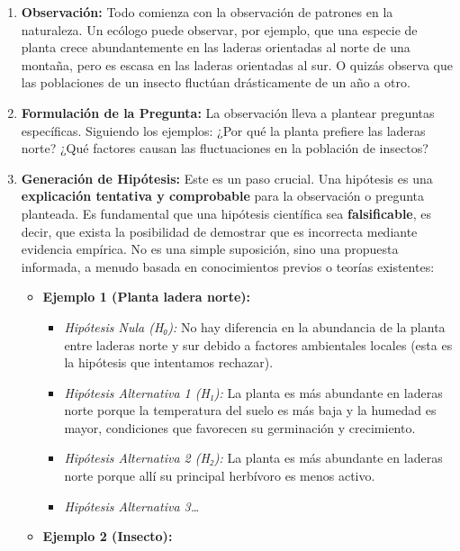 \documentclass[
]{book}
\providecommand{\tightlist}{%
  \setlength{\itemsep}{0pt}\setlength{\parskip}{0pt}}
\begin{document}
\begin{enumerate}
\def\labelenumi{\arabic{enumi}.}
\item
  \textbf{Observación:} Todo comienza con la observación de patrones en la naturaleza. Un ecólogo puede observar, por ejemplo, que una especie de planta crece abundantemente en las laderas orientadas al norte de una montaña, pero es escasa en las laderas orientadas al sur. O quizás observa que las poblaciones de un insecto fluctúan drásticamente de un año a otro.
\item
  \textbf{Formulación de la Pregunta:} La observación lleva a plantear preguntas específicas. Siguiendo los ejemplos: ¿Por qué la planta prefiere las laderas norte? ¿Qué factores causan las fluctuaciones en la población de insectos?
\item
  \textbf{Generación de Hipótesis:} Este es un paso crucial. Una hipótesis es una \textbf{explicación tentativa y comprobable} para la observación o pregunta planteada. Es fundamental que una hipótesis científica sea \textbf{falsificable}, es decir, que exista la posibilidad de demostrar que es incorrecta mediante evidencia empírica. No es una simple suposición, sino una propuesta informada, a menudo basada en conocimientos previos o teorías existentes:

  \begin{itemize}
  \tightlist
  \item
    \textbf{Ejemplo 1 (Planta ladera norte):}

    \begin{itemize}
    \tightlist
    \item
      \emph{Hipótesis Nula (H₀):} No hay diferencia en la abundancia de la planta entre laderas norte y sur debido a factores ambientales locales (esta es la hipótesis que intentamos rechazar).
    \item
      \emph{Hipótesis Alternativa 1 (H₁):} La planta es más abundante en laderas norte porque la temperatura del suelo es más baja y la humedad es mayor, condiciones que favorecen su germinación y crecimiento.
    \item
      \emph{Hipótesis Alternativa 2 (H₂):} La planta es más abundante en laderas norte porque allí su principal herbívoro es menos activo.
    \item
      \emph{Hipótesis Alternativa 3\ldots{}}
    \end{itemize}
  \item
    \textbf{Ejemplo 2 (Insecto):}


\end{itemize}
\end{enumerate}
\end{document}
